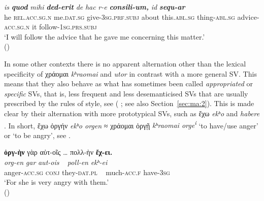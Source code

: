 \documentclass[output=paper,colorlinks,citecolor=brown]{langscibook}
\begin{document}
\z


\ea\label{ex:ma:8}

\gll \emph{is} \textbf{\itshape quod} \emph{mihi} \textbf{\itshape ded-erit} \emph{de}
\emph{hac} \emph{r-e} \textbf{\itshape consili-um,} \emph{id} \textbf{\itshape sequ-ar}\\
he \textsc{rel.acc.sg.n} me.\textsc{dat.sg} give-\textsc{3sg.prf.subj} about
this.\textsc{abl.sg} thing-\textsc{abl.sg} advice-\textsc{acc.sg.n} it follow-\textsc{1sg.prs.subj}\\
\glt `I will follow the advice that he gave me concerning this matter.' \\ 
\hspace*{\fill}()

\z

In some other contexts there is no apparent alternation other than the lexical specificity
of χράομαι \emph{kʰraomai} and \emph{utor} in contrast with a more
general SV. This means that they also behave as what has sometimes been called
\emph{appropriated} or \emph{specific} SVs, that is, less frequent and less desemanticised
SVs that are usually prescribed by the rules of style, see 
(\citealt[100–107]{gross_pour_2004} \citealt{alonso_ramos_construcciones_2004}; see also
Section~\ref{sec:ma:2}). This is made clear by their alternation with more prototypical
SVs, such as ἔχω \emph{ekʰo}  and \emph{habere}
. In short, ἔχω ὀργήν \emph{ekʰo orgen} ≈ χράομαι ὀργῇ
\emph{kʰraomai orge\textsuperscript{i}} `to have/use anger' or `to be
angry', see .

\largerpage[2]
\ea\label{ex:ma:9}

\ea\label{ex:ma:9a}

\glll \textbf{ὀργ-ὴν} γὰρ αὐτ-οῖς \ldots{} πολλ-ὴν \textbf{ἔχ-ει.}\\
 \textit{org-en} \textit{gar} \textit{aut-ois} ~ \textit{poll-en} \textit{ekʰ-ei}\\
anger-\textsc{acc.sg} \textsc{conj} they-\textsc{dat.pl} ~ much-\textsc{acc.f} have-\textsc{3sg}\\
\glt `For she is very angry with them.' \\
\hspace*{\fill}()

\ex\label{ex:ma:9b}
\end{document}
